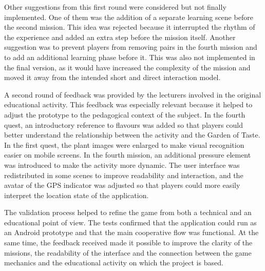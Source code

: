 Other suggestions from this first round were considered but not finally implemented. One of them was the addition of a separate learning scene before the second mission. This idea was rejected because it interrupted the rhythm of the experience and added an extra step before the mission itself. Another suggestion was to prevent players from removing pairs in the fourth mission and to add an additional learning phase before it. This was also not implemented in the final version, as it would have increased the complexity of the mission and moved it away from the intended short and direct interaction model.

A second round of feedback was provided by the lecturers involved in the original educational activity. This feedback was especially relevant because it helped to adjust the prototype to the pedagogical context of the subject. In the fourth quest, an introductory reference to flavours was added so that players could better understand the relationship between the activity and the Garden of Taste. In the first quest, the plant images were enlarged to make visual recognition easier on mobile screens. In the fourth mission, an additional pressure element was introduced to make the activity more dynamic. The user interface was redistributed in some scenes to improve readability and interaction, and the avatar of the GPS indicator was adjusted so that players could more easily interpret the location state of the application.

The validation process helped to refine the game from both a technical and an educational point of view. The tests confirmed that the application could run as an Android prototype and that the main cooperative flow was functional. At the same time, the feedback received made it possible to improve the clarity of the missions, the readability of the interface and the connection between the game mechanics and the educational activity on which the project is based.
